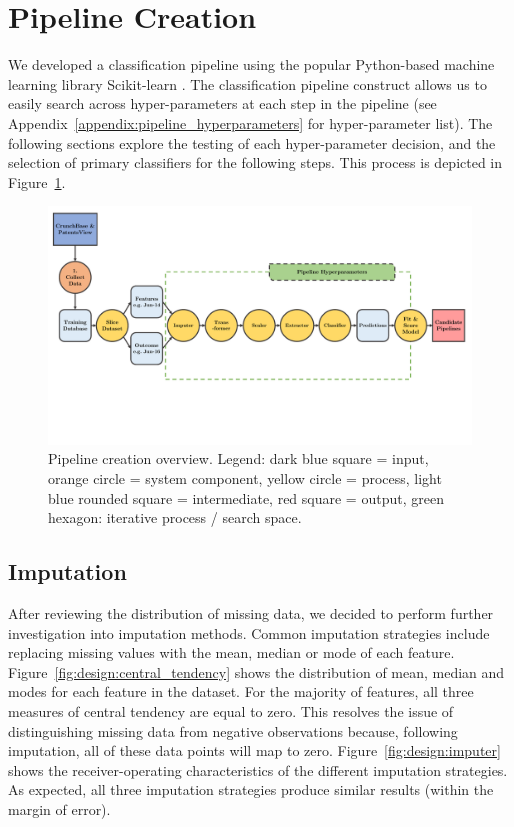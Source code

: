 \documentclass[../thesis/thesis.tex]{subfiles}
\begin{document}
\section{Pipeline Creation}

We developed a classification pipeline using the popular Python-based machine learning library Scikit-learn \cite{pedregosa2011}. The classification pipeline construct allows us to easily search across hyper-parameters at each step in the pipeline (see Appendix~\ref{appendix:pipeline_hyperparameters} for hyper-parameter list). The following sections explore the testing of each hyper-parameter decision, and the selection of primary classifiers for the following steps. This process is depicted in Figure~\ref{fig:design:pipeline_creation}.

\begin{figure}[!htb]
    \centering
    \includegraphics[width=\textwidth]{../figures/design/flowchart_pipeline_creation}
    \caption[Pipeline creation flowchart]{Pipeline creation overview. Legend: dark blue square = input, orange circle = system component, yellow circle = process, light blue rounded square = intermediate, red square = output, green hexagon: iterative process / search space.}
    \label{fig:design:pipeline_creation}
\end{figure}

\subsection{Imputation}

After reviewing the distribution of missing data, we decided to perform further investigation into imputation methods. Common imputation strategies include replacing missing values with the mean, median or mode of each feature. Figure~\ref{fig:design:central_tendency} shows the distribution of mean, median and modes for each feature in the dataset. For the majority of features, all three measures of central tendency are equal to zero. This resolves the issue of distinguishing missing data from negative observations because, following imputation, all of these data points will map to zero. Figure~\ref{fig:design:imputer} shows the receiver-operating characteristics of the different imputation strategies. As expected, all three imputation strategies produce similar results (within the margin of error).
\end{document}
